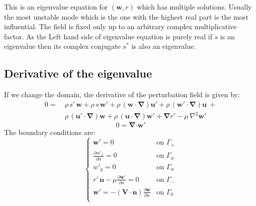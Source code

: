 \documentclass[12pt, a4paper]{article}
\begin{document}
        This is an eigenvalue equation for $(\mathbf{w},r)$ which has multiple solutions. Usually the most unstable mode which is the one with the highest real part is the most influential. The field is fixed only up to an arbitrary complex multiplicative factor. As the Left hand side of eigenvalue equation is purely real if $s$ is an eigenvalue then its complex conjugate $s^*$ is also an eigenvalue.
        
    \subsection{Derivative of the eigenvalue}
        If we change the domain, the derivative of the perturbation field is given by:
        \begin{equation} \label{perturbation_change_1}
        \begin{split}
            0 = \ & \rho \, s' \, \mathbf{w} + 
                \rho \, s \, \mathbf{w'} + 
                \rho \, (\mathbf{w \cdot} \boldsymbol{\nabla}) \mathbf{u'} + 
                \rho \, (\mathbf{w' \cdot} \boldsymbol{\nabla}) \mathbf{u} \ + \\
            &\rho \, (\mathbf{u' \cdot} \boldsymbol{\nabla}) \mathbf{w} + 
                \rho \, (\mathbf{u \cdot} \boldsymbol{\nabla}) \mathbf{w'} +
                \boldsymbol{\nabla} r' - 
                \mu \, \nabla^2 \mathbf{w'}
        \end{split}
        \end{equation}
        \begin{equation} \label{perturbation_change_2}
            0 = \boldsymbol{\nabla} \mathbf{\cdot w'}
        \end{equation}
        The boundary conditions are:
        \begin{equation} \label{perturbation_change_bcs}
        \begin{cases}
            \mathbf{w'} = 0 & \text{on } \Gamma_+ \\
            \frac{\partial w'_x}{\partial n} = 0 & \text{on } \Gamma_w \\
            w'_y = 0 & \text{on } \Gamma_w \\
            r' \, \mathbf{n} - \mu \frac{\partial \mathbf{w'}}{\partial n} = 0 & \text{on } \Gamma_- \\
            \mathbf{w'} = - (\mathbf{V \cdot n}) \frac{\partial \mathbf{w}}{\partial n} & \text{on } \Gamma_0 \\
        \end{cases}
        \end{equation}
        
\end{document}
